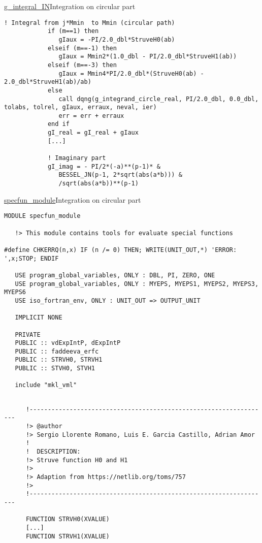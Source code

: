 \begin{frame}{\url{g_integral_IN}}{Integration on circular part}
  \begin{lstlisting}[style=myFORTRANcodeS]
            ! Integral from j*Mmin  to Mmin (circular path)
            if (m==1) then
               gIaux = -PI/2.0_dbl*StruveH0(ab)
            elseif (m==-1) then
               gIaux = Mmin2*(1.0_dbl - PI/2.0_dbl*StruveH1(ab))
            elseif (m==-3) then
               gIaux = Mmin4*PI/2.0_dbl*(StruveH0(ab) - 2.0_dbl*StruveH1(ab)/ab)
            else
               call dqng(g_integrand_circle_real, PI/2.0_dbl, 0.0_dbl, tolabs, tolrel, gIaux, erraux, neval, ier)
               err = err + erraux
            end if
            gI_real = gI_real + gIaux
            [...]
            
            ! Imaginary part
            gI_imag = - PI/2*(-a)**(p-1)* & 
               BESSEL_JN(p-1, 2*sqrt(abs(a*b))) &
               /sqrt(abs(a*b))**(p-1)
  \end{lstlisting}
\end{frame}


\begin{frame}{\url{specfun_module}}{Integration on circular part}
  \begin{lstlisting}[style=myFORTRANcodeS]
MODULE specfun_module

   !> This module contains tools for evaluate special functions

#define CHKERRQ(n,x) IF (n /= 0) THEN; WRITE(UNIT_OUT,*) 'ERROR: ',x;STOP; ENDIF

   USE program_global_variables, ONLY : DBL, PI, ZERO, ONE
   USE program_global_variables, ONLY : MYEPS, MYEPS1, MYEPS2, MYEPS3, MYEPS6
   USE iso_fortran_env, ONLY : UNIT_OUT => OUTPUT_UNIT

   IMPLICIT NONE

   PRIVATE
   PUBLIC :: vdExpIntP, dExpIntP
   PUBLIC :: faddeeva_erfc
   PUBLIC :: STRVH0, STRVH1 
   PUBLIC :: STVH0, STVH1 

   include "mkl_vml"
  \end{lstlisting}
  
  \begin{lstlisting}[style=myFORTRANcodeS]

      !------------------------------------------------------------------
      !> @author
      !> Sergio Llorente Romano, Luis E. Garcia Castillo, Adrian Amor
      !
      !  DESCRIPTION:
      !> Struve function H0 and H1
      !> 
      !> Adaption from https://netlib.org/toms/757 
      !>
      !------------------------------------------------------------------
      
      FUNCTION STRVH0(XVALUE)
      [...]
      FUNCTION STRVH1(XVALUE)
   
  \end{lstlisting}
\end{frame}
